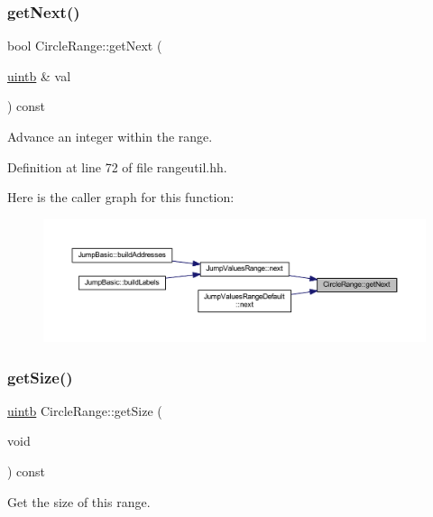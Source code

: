 \subsubsection{\texorpdfstring{getNext()}{getNext()}}
{\footnotesize\ttfamily bool Circle\+Range\+::get\+Next (\begin{DoxyParamCaption}\item[{\mbox{\hyperlink{types_8h_a2db313c5d32a12b01d26ac9b3bca178f}{uintb}} \&}]{val }\end{DoxyParamCaption}) const\hspace{0.3cm}{\ttfamily [inline]}}



Advance an integer within the range. 



Definition at line 72 of file rangeutil.\+hh.

Here is the caller graph for this function\+:
\nopagebreak
\begin{figure}[H]
\begin{center}
\leavevmode
\includegraphics[width=350pt]{class_circle_range_a761580f8aa6158005bf278654fc21cd1_icgraph}
\end{center}
\end{figure}
\mbox{\label{class_circle_range_a606c680231a59b4439f17409d8c479e5}} 
\subsubsection{\texorpdfstring{getSize()}{getSize()}}
{\footnotesize\ttfamily \mbox{\hyperlink{types_8h_a2db313c5d32a12b01d26ac9b3bca178f}{uintb}} Circle\+Range\+::get\+Size (\begin{DoxyParamCaption}\item[{void}]{ }\end{DoxyParamCaption}) const}



Get the size of this range. 

